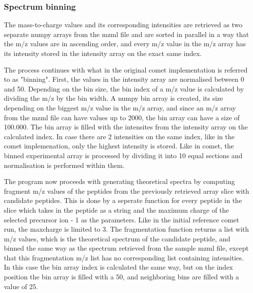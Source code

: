 \documentclass[11pt]{article}
\begin{document}
\subsubsection{Spectrum binning}
The mass-to-charge values and its corresponding intensities are retrieved as two separate numpy arrays from the mzml file and are sorted in parallel in a way that the m/z values are in ascending order, and every m/z value in the m/z array has its intensity stored in the intensity array on the exact same index.

The process continues with what in the original comet implementation is referred to as "binning". First, the values in the intensity array are normalised between 0 and 50. Depending on the bin size, the bin index of a m/z value is calculated by dividing the m/z by the bin width. A numpy bin array is created, its size depending on the biggest m/z value in the m/z array, and since an m/z array from the mzml file can have values up to 2000, the bin array can have a size of 100.000. The bin array is filled with the intensites from the intensity array on the calculated index. In case there are 2 intensities on the same index, like in the comet implemenation, only the highest intensity is stored. Like in comet, the binned experimental array is processed by dividing it into 10 equal sections and normalisation is performed within them.

The program now proceeds with generating theoretical spectra by computing fragment m/z values of the peptides from the previously retrieved array slice with candidate peptides. This is done by a seperate function for every peptide in the slice which takes in the peptide as a string and the maximum charge of the selected precursor ion - 1 as the parameters. Like in the initial reference comet run, the maxcharge is limited to 3. The fragmentation function returns a list with m/z values, which is the theoretical spectrum of the candidate peptide, and binned the same way as the spectrum retrieved from the sample mzml file, except that this fragmentation m/z list has no corresponding list containing intensities. In this case the bin array index is calculated the same way, but on the index position the bin array is filled with a 50, and neighboring bins are filled with a value of 25. 
\end{document}
